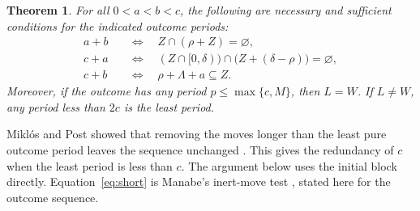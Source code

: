 \documentclass[11pt]{article}
\newtheorem{theorem}{Theorem}
\begin{document}
\begin{theorem}\label{thm:tests}
For all $0<a<b<c$, the following are necessary and sufficient
conditions for the indicated outcome periods:
\begin{align}
 a+b\quad &\Longleftrightarrow\quad
    Z\cap(\rho+Z)=\varnothing, \label{eq:short}\\
 c+a\quad &\Longleftrightarrow\quad
    (Z\cap[0,\delta))\cap\bigl(Z+(\delta-\rho)\bigr)=\varnothing,
    \label{eq:middle}\\
 c+b\quad &\Longleftrightarrow\quad
    \rho+\Lambda+a\subseteq Z. \label{eq:long}
\end{align}
Moreover, if the outcome has any period $p\le\max\{c,M\}$, then
$L=W$. If $L\ne W$, any period less than $2c$ is the least period.
\end{theorem}

Mikl\'os and Post showed that removing the moves longer than the least
pure outcome period leaves the sequence unchanged
\cite[Proposition~7]{miklos-post}. This gives the redundancy of $c$ when
the least period is less than $c$. The argument below uses the initial
block directly. Equation~\eqref{eq:short} is
Manabe's inert-move test \cite[Definition~19 and Proposition~25]{manabe},
stated here for the outcome sequence.
\end{document}
